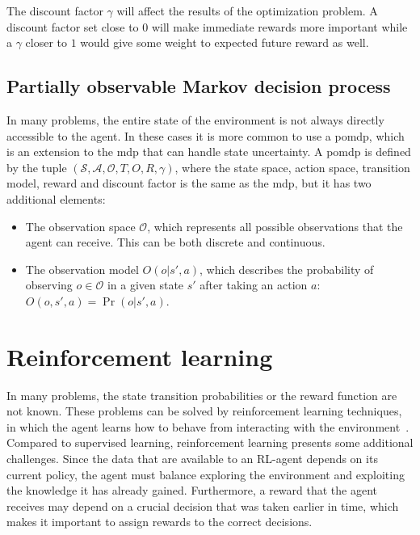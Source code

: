 The discount factor $\gamma$ will affect the results of the optimization problem. A discount factor set close to $0$ will make immediate rewards more important while a $\gamma$ closer to $1$ would give some weight to expected future reward as well. 

\subsection{Partially observable Markov decision process}\label{section:pomdp}
In many problems, the entire state of the environment is not always directly accessible to the agent. In these cases it is more common to use a \gls{pomdp}, which is an extension to the \gls{mdp} that can handle state uncertainty. A \gls{pomdp} is defined by the tuple $(\mathcal{S},\mathcal{A},\mathcal{O},T,O,R,\gamma)$, where the state space, action space, transition model, reward and discount factor is the same as the \gls{mdp}, but it has two additional elements: 
\begin{itemize}
    \item The observation space $\mathcal{O}$, which represents all possible observations that the agent can receive. This can be both discrete and continuous.
    \item The observation model $O(o|s',a)$, which describes the probability of observing $o \in \mathcal{O}$ in a given state $s'$ after taking an action $a$: $O(o,s',a)=\Pr(o|s',a)$.
\end{itemize}





\section{Reinforcement learning}
In many problems, the state transition probabilities or the reward function are not known. These problems can be solved by reinforcement learning techniques, in which the agent learns how to behave from interacting with the environment~\cite[Ch. 5]{Kochenderfer2015}. Compared to supervised learning, reinforcement learning presents some additional challenges. Since the data that are available to an RL-agent depends on its current policy, the agent must balance exploring the environment and exploiting the knowledge it has already gained. Furthermore, a reward that the agent receives may depend on a crucial decision that was taken earlier in time, which makes it important to assign rewards to the correct decisions.

